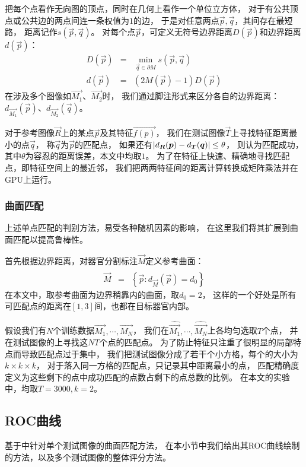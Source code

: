 把每个点看作无向图的顶点，同时在几何上看作一个单位立方体，
对于有公共顶点或公共边的两点间连一条权值为$1$的边，
于是对任意两点$\vec{p}, \vec{q}$，其间存在最短路，
距离记作$s(\vec{p}, \vec{q})$。
对每个点$\vec{p}$，可定义无符号边界距离$D(\vec{p})$和边界距离$d(\vec{p})$：
\begin{eqnarray}
    D(\vec{p}) &=& \min_{\vec{q} \in \partial M} s(\vec{p}, \vec{q}) \\
    d(\vec{p}) &=& (2M(\vec{p})-1)D(\vec{p})
\end{eqnarray}
在涉及多个图像如$\vec{M_1}$、$\vec{M_2}$时，
我们通过脚注形式来区分各自的边界距离：
$d_{\vec{M_1}}(\vec{p})$、$d_{\vec{M_2}}(\vec{q})$。

对于参考图像$\vec{R}$上的某点$\vec{p}$及其特征$\vec{f(p)}$，
我们在测试图像$\vec{T}$上寻找特征距离最小的点$\vec{q}$，
称$\vec{q}$为$\vec{p}$的匹配点，
如果还有$\left|d_{\boldsymbol{R}}(\boldsymbol{p}) - d_{\boldsymbol{T}}(\boldsymbol{q})\right| \le \theta$，
则认为匹配成功，其中$\theta$为容忍的距离误差，本文中均取$1$。
为了在特征上快速、精确地寻找匹配点，即特征空间上的最近邻，
我们把两两特征间的距离计算转换成矩阵乘法并在GPU上运行。

\subsubsection{曲面匹配\label{sec:expr:match}}
上述单点匹配的判别方法，易受各种随机因素的影响，
在这里我们将其扩展到曲面匹配以提高鲁棒性。

首先根据边界距离，对器官分割标注$\vec{M}$定义参考曲面：
\begin{eqnarray}
    \hat{\vec{M}} &=& \left\{ \vec{p} : d_{\vec{M}}(\vec{p}) = d_0 \right\}
\end{eqnarray}
在本文中，取参考曲面为边界稍靠内的曲面，取$d_0=2$，
这样的一个好处是所有可匹配点的距离在$[1, 3]$间，也都在目标器官内部。

假设我们有$N$个训练数据$\vec{M_1},\cdots,\vec{M_N}$，
我们在$\hat{\vec{M_1}},\cdots,\hat{\vec{M_N}}$上各均匀选取$T$个点，
并在测试图像的上寻找这$NT$个点的匹配点。
为了防止特征只注重了很明显的局部特点而导致匹配点过于集中，
我们把测试图像分成了若干个小方格，每个的大小为$k\times k \times k$，
对于落入同一方格的匹配点，只记录其中距离最小的点，
匹配精确度定义为这些剩下的点中成功匹配的点数占剩下的点总数的比例。
在本文的实验中，均取$T=3000, k=2$。


\subsection{ROC曲线}
基于中针对单个测试图像的曲面匹配方法，
在本小节中我们给出其ROC曲线绘制的方法，以及多个测试图像的整体评分方法。

